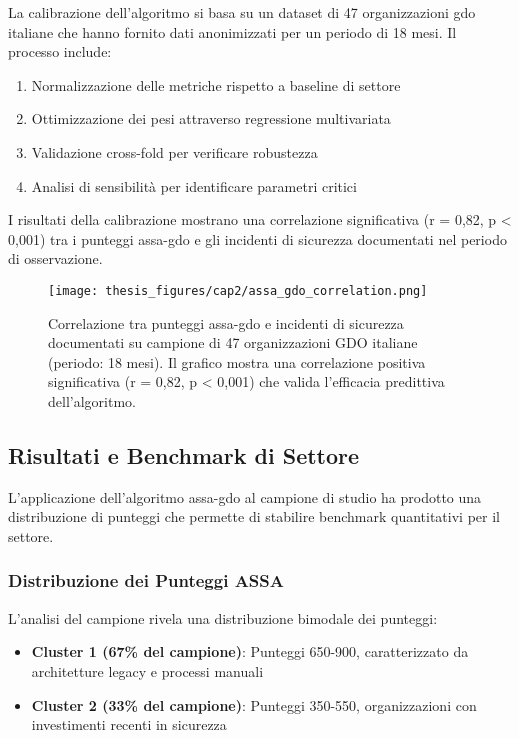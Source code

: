 La calibrazione dell'algoritmo si basa su un dataset di 47 organizzazioni \gls{gdo} italiane che hanno fornito dati anonimizzati per un periodo di 18 mesi. Il processo include:

\begin{enumerate}
\item Normalizzazione delle metriche rispetto a baseline di settore
\item Ottimizzazione dei pesi attraverso regressione multivariata
\item Validazione cross-fold per verificare robustezza
\item Analisi di sensibilità per identificare parametri critici
\end{enumerate}

I risultati della calibrazione mostrano una correlazione significativa (r = 0,82, p < 0,001) tra i punteggi \gls{assa-gdo} e gli incidenti di sicurezza documentati nel periodo di osservazione.

\begin{figure}[htbp]
\centering
\texttt{[image: thesis\_figures/cap2/assa\_gdo\_correlation.png]}
\caption{Correlazione tra punteggi \gls{assa-gdo} e incidenti di sicurezza documentati su campione di 47 organizzazioni GDO italiane (periodo: 18 mesi). Il grafico mostra una correlazione positiva significativa (r = 0,82, p < 0,001) che valida l'efficacia predittiva dell'algoritmo.}
\label{fig:assa_correlation}
\end{figure}

\subsection{\texorpdfstring{Risultati e Benchmark di Settore}{2.3.3 - Risultati e Benchmark di Settore}}
\label{subsec:2.3.3_risultati}

L'applicazione dell'algoritmo \gls{assa-gdo} al campione di studio ha prodotto una distribuzione di punteggi che permette di stabilire benchmark quantitativi per il settore.

\subsubsection{Distribuzione dei Punteggi ASSA}

L'analisi del campione rivela una distribuzione bimodale dei punteggi:

\begin{itemize}
\item \textbf{Cluster 1 (67\% del campione)}: Punteggi 650-900, caratterizzato da architetture legacy e processi manuali
\item \textbf{Cluster 2 (33\% del campione)}: Punteggi 350-550, organizzazioni con investimenti recenti in sicurezza
\end{itemize}

